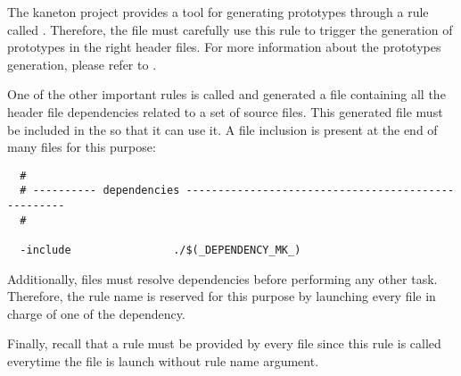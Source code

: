 The kaneton project provides a tool for generating  prototypes
through a  rule called . Therefore, the
 file must carefully use this rule to trigger the generation
of prototypes in the right header files. For more information about the
prototypes generation, please refer to .

One of the other important rules is called  and generated
a file containing all the header file dependencies related to a set of
 source files. This generated file must be included in the
 so that it can use it. A  file inclusion is
present at the end of many  files for this purpose:

\begin{verbatim}
  #
  # ---------- dependencies ---------------------------------------------------
  #

  -include                ./$(_DEPENDENCY_MK_)
\end{verbatim}

Additionally,  files must resolve dependencies before performing
any other task. Therefore, the rule name  is reserved
for this purpose by launching every  file in charge of one of
the dependency.

Finally, recall that a  rule must be provided by every
 file since this rule is called everytime the 
file is launch without rule name argument.
